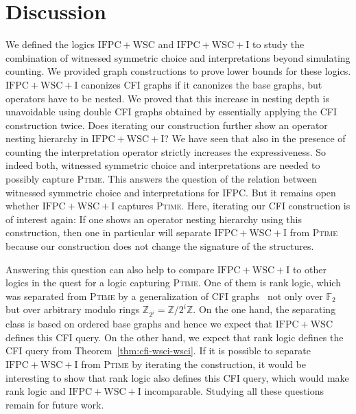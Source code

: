 \documentclass[]{lmcs}
\newcommand{\ZZ}{\mathbb{Z}}
\newcommand{\FF}{\mathbb{F}}
\newcommand{\PTime}{\textsc{Ptime}}
\newcommand{\IFPC}{\ensuremath{\mathrm{IFPC}}}
\newcommand{\IFPCWSC}{\ensuremath{\mathrm{IFPC{+}WSC}}}
\newcommand{\IFPCWSCI}{\ensuremath{\mathrm{IFPC{+}WSC{+}I}}}
\begin{document}
\section{Discussion}
\label{sec:discussion}

We defined the logics \IFPCWSC{} and \IFPCWSCI{}
to study the combination of witnessed symmetric choice and interpretations
beyond simulating counting.
We provided graph constructions to prove lower bounds for these logics.
\IFPCWSCI{} canonizes CFI graphs if it canonizes the base graphs, but operators have to be nested.
We proved that this increase in nesting depth is unavoidable using double CFI graphs obtained by essentially applying the CFI construction twice.
Does iterating our construction further show an operator nesting hierarchy in \IFPCWSCI{}?
We have seen that also in the presence of counting
the interpretation operator strictly increases the expressiveness.
So indeed both, witnessed symmetric choice and interpretations are needed to possibly capture \PTime{}.
This answers the question of the relation between witnessed symmetric choice and interpretations for \IFPC{}.
But it remains open whether \IFPCWSCI{} captures \PTime{}.
Here, iterating our CFI construction is of interest again:
If one shows an operator nesting hierarchy using this construction,
then one in particular will separate \IFPCWSCI{} from \PTime{}
because our construction does not change the signature of the structures.

Answering this question can also help to compare \IFPCWSCI{} to other logics in the quest for a logic capturing \PTime{}.
One of them is rank logic, which was separated from \PTime{} by a generalization of CFI graphs~\cite{Lichter2023} not only over $\FF_2$ but over arbitrary modulo rings $\ZZ_{2^i} = \ZZ / 2^i \ZZ$.
On the one hand, the separating class is based on ordered base graphs
and hence we expect that \IFPCWSC{} defines this CFI query.
On the other hand, we expect that rank logic defines the CFI query from Theorem~\ref{thm:cfi-wsci-wsci}.
If it is possible to separate \IFPCWSCI{} from \PTime{} by iterating the construction,
it would be interesting to show that rank logic also defines this CFI query,
which would make rank logic and \IFPCWSCI{} incomparable.
Studying all these questions remain for future work.




\end{document}
